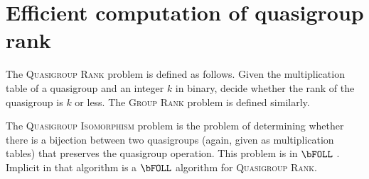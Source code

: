 \documentclass{article}
\begin{document}
\section{Efficient computation of quasigroup rank}

The \textsc{Quasigroup Rank} problem is defined as follows.
Given the multiplication table of a quasigroup and an integer $k$ in binary, decide whether the rank of the quasigroup is $k$ or less.
The \textsc{Group Rank} problem is defined similarly.

The \textsc{Quasigroup Isomorphism} problem is the problem of determining whether there is a bijection between two quasigroups (again, given as multiplication tables) that preserves the quasigroup operation.
This problem is in $\bFOLL$ \autocite[Theorem~3.4]{ctw13}.
Implicit in that algorithm is a $\bFOLL$ algorithm for \textsc{Quasigroup Rank}.
\end{document}
